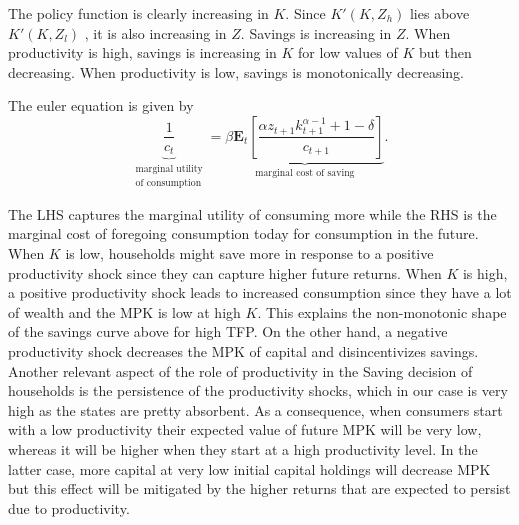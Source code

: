 \documentclass[10pt]{article}
\begin{document}
The policy function is clearly increasing in $K$. Since $K'(K, Z_{h})$ lies above $K'(K, Z_{l})$ , it is also increasing in $Z$. Savings is increasing in $Z$. When productivity is high, savings is increasing in $K$ for low values of $K$ but then decreasing. When productivity is low, savings is monotonically decreasing. 

The euler equation is given by 
\[ \underbrace{\frac{1}{c_t}}_{\substack{\text{marginal utility} \\  \text{of consumption}}} = \underbrace{\beta \mathbf{E}_t \left[ \frac{\alpha z_{t+1} k_{t+1}^{\alpha - 1} + 1 - \delta }{c_{t+1}} \right]}_{\text{marginal cost of saving}} . \]

The LHS captures the marginal utility of consuming more while the RHS is the marginal cost of foregoing consumption today for consumption in the future. When $K$ is low, households might save more in response to a positive productivity shock since they can capture higher future returns. When $K$ is high, a positive productivity shock
leads to increased consumption since they have a lot of wealth and the MPK is low at high $K$. This explains the non-monotonic shape of the savings curve above for high TFP. On the other hand, a negative productivity shock decreases the MPK of capital and disincentivizes savings. Another relevant aspect of the role of productivity in the Saving decision of households is the persistence of the productivity shocks, which in our case is very high as the states are pretty absorbent. 
As a consequence, when consumers start with a low productivity their expected value of future MPK will be very low, whereas it will be higher when they start at a high productivity level. In the latter case, more capital at very low initial capital holdings will decrease MPK but this effect will be mitigated by the higher returns that are expected to persist due to productivity. 
\end{document}

